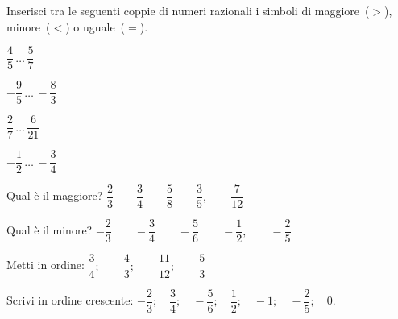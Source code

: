 \subsubsection*{}

\begin{esercizio}
 \label{ese:3.29}
Inserisci tra le seguenti coppie di numeri razionali i simboli di 
maggiore~(\(>\)), minore~(\(<\)) o uguale~(\(=\)).

\begin{htmulticols}{4}
\begin{enumeratees}
\spazielenx
 \item \(\dfrac{4}{5}\,\ldots\,\dfrac{5}{7}\)
 \item \(-\dfrac{9}{5}\,\ldots\,-\dfrac{8}{3}\)
 \item \(\dfrac{2}{7}\,\ldots\,\dfrac{6}{21}\)
 \item \(-\dfrac{1}{2}\,\ldots\,-\dfrac{3}{4}\)
\end{enumeratees}
\end{htmulticols}
\end{esercizio}


\begin{esercizio}
 \label{ese:3.30}
Qual è il maggiore? \qquad 
\(\dfrac{2}{3} \qquad \dfrac{3}{4} \qquad \dfrac{5}{8} \qquad \dfrac{3}{5},
\qquad \dfrac{7}{12}\)
\end{esercizio}

\begin{esercizio}
 \label{ese:3.31}
Qual è il minore? \qquad 
\(-\dfrac{2}{3} \qquad -\dfrac{3}{4} \qquad -\dfrac{5}{6} \qquad 
-\dfrac{1}{2}, \qquad -\dfrac{2}{5}\)
\end{esercizio}

\begin{esercizio}
\label{ese:3.35}
Metti in ordine: \qquad
\(\dfrac{3}{4};\qquad\dfrac{4}{3};\qquad\dfrac{11}{12};\qquad\dfrac{5}{3}\)
\end{esercizio}

\begin{esercizio}
 \label{ese:3.32}
Scrivi in ordine crescente:
% 
\(-\dfrac{2}{3}; \quad \dfrac{3}{4}; \quad -\dfrac{5}{6}; \quad 
\dfrac{1}{2}; \quad -1; \quad -\dfrac{2}{5}; \quad 0.\)
\end{esercizio}

